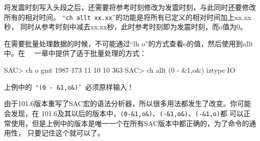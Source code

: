 将发震时刻写入头段之后，还需要将参考时刻修改为发震时刻，与此同时还要修改所有的相对时间。
``\lstinline{ch allt xx.xx}''的功能是将所有已定义的相对时间加上xx.xx秒，
同时从参考时刻中减去xx.xx秒，此时参考时刻即为发震时刻，而o值为0。

在需要批量处理数据的时候，不可能通过``lh o''的方式查看o的值，然后使用到allt中。在
~~一章中提供了适于批量处理的方式：
\begin{SACCode}
SAC> ch o gmt 1987 173 11 10 10 363 
SAC> ch allt (0 - &1,o&) iztype IO
\end{SACCode}

\begin{Tips}
上例中的~``\lstinline{(0 - &1,o&)}''~必须原样输入！
    
由于101.6版本重写了SAC宏的语法分析器，所以很多用法都发生了改变。你可能会发现，在
101.6及其以后的版本中，\lstinline{(0-&1,o&)}、\lstinline{(-&1,o&)}、\lstinline{(-&1,o)}都
可以正常使用，但是上例中的版本是唯一一个在所有SAC版本中都正确的，为了命令的通用性，
只要记住这个就可以了。
\end{Tips}
